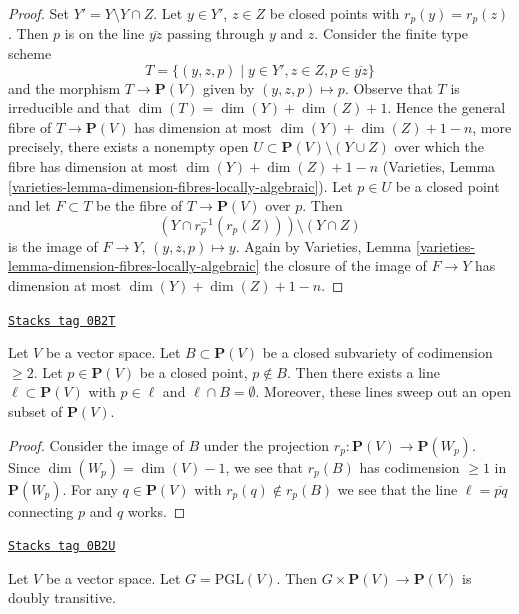 \begin{proof}
Set $Y' = Y \setminus Y \cap Z$.
Let $y \in Y'$, $z \in Z$ be closed points with $r_p(y) = r_p(z)$.
Then $p$ is on the line $\overline{yz}$ passing through $y$ and $z$.
Consider the finite type scheme
$$
T = \{(y, z, p) \mid y \in Y', z \in Z, p \in \overline{yz}\}
$$
and the morphism $T \to \mathbf{P}(V)$ given by $(y, z, p) \mapsto p$.
Observe that $T$ is irreducible and that $\dim(T) = \dim(Y) + \dim(Z) + 1$.
Hence the general fibre of $T \to \mathbf{P}(V)$ has dimension at most
$\dim(Y) + \dim(Z) + 1 - n$, more precisely, there exists a nonempty
open $U \subset \mathbf{P}(V) \setminus (Y \cup Z)$ over
which the fibre has dimension at most $\dim(Y) + \dim(Z) + 1 - n$
(Varieties, Lemma \ref{varieties-lemma-dimension-fibres-locally-algebraic}).
Let $p \in U$ be a closed point and let $F \subset T$ be the fibre
of $T \to \mathbf{P}(V)$ over $p$. Then
$$
(Y \cap r_p^{-1}(r_p(Z))) \setminus (Y \cap Z)
$$
is the image of $F \to Y$, $(y, z, p) \mapsto y$. Again by
Varieties, Lemma \ref{varieties-lemma-dimension-fibres-locally-algebraic}
the closure of the image of $F \to Y$ has dimension at most
$\dim(Y) + \dim(Z) + 1 - n$.
\end{proof}

\begin{lemma}
\label{intersection-lemma-find-lines}
\href{https://stacks.math.columbia.edu/tag/0B2T}{\texttt{Stacks tag 0B2T}}

Let $V$ be a vector space. Let $B \subset \mathbf{P}(V)$
be a closed subvariety of codimension $\geq 2$.
Let $p \in \mathbf{P}(V)$ be a closed point, $p \not \in B$.
Then there exists a line $\ell \subset \mathbf{P}(V)$
with $p \in \ell$ and $\ell \cap B = \emptyset$. Moreover, these lines
sweep out an open subset of $\mathbf{P}(V)$.
\end{lemma}

\begin{proof}
Consider the image of $B$ under the projection
$r_p : \mathbf{P}(V) \to \mathbf{P}(W_p)$.
Since $\dim(W_p) = \dim(V) - 1$, we see that $r_p(B)$
has codimension $\geq 1$ in $\mathbf{P}(W_p)$.
For any $q \in \mathbf{P}(V)$ with $r_p(q) \not \in r_p(B)$
we see that the line $\ell = \overline{pq}$ connecting $p$ and $q$ works.
\end{proof}

\begin{lemma}
\label{intersection-lemma-doubly-transitive}
\href{https://stacks.math.columbia.edu/tag/0B2U}{\texttt{Stacks tag 0B2U}}

Let $V$ be a vector space. Let $G = \text{PGL}(V)$.
Then $G \times \mathbf{P}(V) \to \mathbf{P}(V)$ is
doubly transitive.
\end{lemma}

